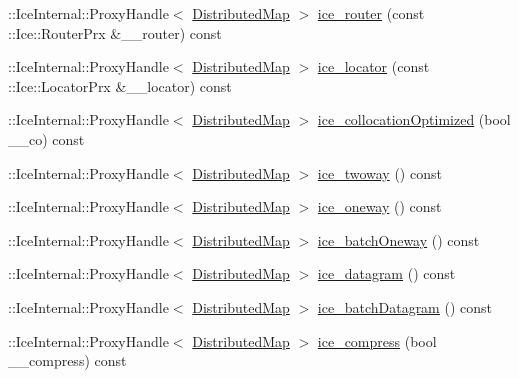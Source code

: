 \begin{DoxyCompactItemize}
\item 
::IceInternal::ProxyHandle$<$ \hyperlink{class_ice_proxy_1_1_global_table_1_1_distributed_map}{DistributedMap} $>$ \hyperlink{class_ice_proxy_1_1_global_table_1_1_distributed_map_a4dab9b037b6677cc7b30ea6738646b43}{ice\_\-router} (const ::Ice::RouterPrx \&\_\-\_\-router) const 
\item 
::IceInternal::ProxyHandle$<$ \hyperlink{class_ice_proxy_1_1_global_table_1_1_distributed_map}{DistributedMap} $>$ \hyperlink{class_ice_proxy_1_1_global_table_1_1_distributed_map_a2948cd5ff5bda870a2d0240e6cfacb13}{ice\_\-locator} (const ::Ice::LocatorPrx \&\_\-\_\-locator) const 
\item 
::IceInternal::ProxyHandle$<$ \hyperlink{class_ice_proxy_1_1_global_table_1_1_distributed_map}{DistributedMap} $>$ \hyperlink{class_ice_proxy_1_1_global_table_1_1_distributed_map_a00fa51b1f3a500ea2fad7b34c30debe8}{ice\_\-collocationOptimized} (bool \_\-\_\-co) const 
\item 
::IceInternal::ProxyHandle$<$ \hyperlink{class_ice_proxy_1_1_global_table_1_1_distributed_map}{DistributedMap} $>$ \hyperlink{class_ice_proxy_1_1_global_table_1_1_distributed_map_aa2a9797fbb4e4cb3bf97bc443e598087}{ice\_\-twoway} () const 
\item 
::IceInternal::ProxyHandle$<$ \hyperlink{class_ice_proxy_1_1_global_table_1_1_distributed_map}{DistributedMap} $>$ \hyperlink{class_ice_proxy_1_1_global_table_1_1_distributed_map_a761c30883bdab01e4be04792354110c6}{ice\_\-oneway} () const 
\item 
::IceInternal::ProxyHandle$<$ \hyperlink{class_ice_proxy_1_1_global_table_1_1_distributed_map}{DistributedMap} $>$ \hyperlink{class_ice_proxy_1_1_global_table_1_1_distributed_map_a8477b60ac670660e64cc84b9cf3f4d33}{ice\_\-batchOneway} () const 
\item 
::IceInternal::ProxyHandle$<$ \hyperlink{class_ice_proxy_1_1_global_table_1_1_distributed_map}{DistributedMap} $>$ \hyperlink{class_ice_proxy_1_1_global_table_1_1_distributed_map_ac4681d7d3ef795e9ebff8c3de27a2689}{ice\_\-datagram} () const 
\item 
::IceInternal::ProxyHandle$<$ \hyperlink{class_ice_proxy_1_1_global_table_1_1_distributed_map}{DistributedMap} $>$ \hyperlink{class_ice_proxy_1_1_global_table_1_1_distributed_map_a93ccde09585babaae043a7e656a45fa6}{ice\_\-batchDatagram} () const 
\item 
::IceInternal::ProxyHandle$<$ \hyperlink{class_ice_proxy_1_1_global_table_1_1_distributed_map}{DistributedMap} $>$ \hyperlink{class_ice_proxy_1_1_global_table_1_1_distributed_map_a742b318c5e139dc889c5b9d58184d1a8}{ice\_\-compress} (bool \_\-\_\-compress) const 

\end{DoxyCompactItemize}
